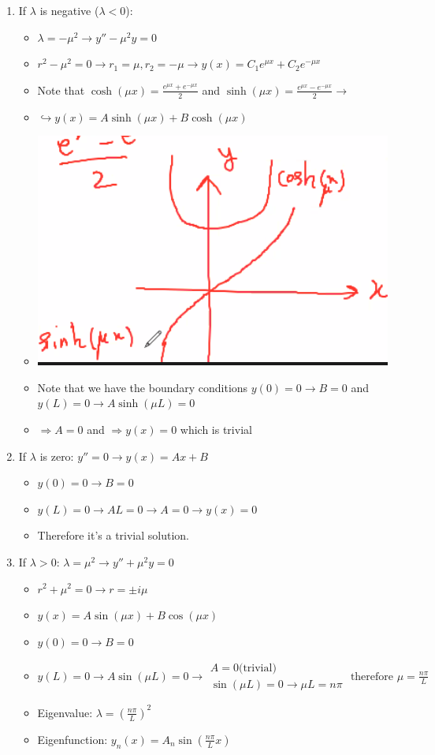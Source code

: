 \begin{enumerate}
    \item If $\lambda$ is negative ($\lambda < 0 $): 
    \begin{itemize}
        \item $\lambda = -\mu^2 \to y'' - \mu^2 y = 0$
        \item $r^2 - \mu^2 = 0 \to r_1 = \mu, r_2 = -\mu \longrightarrow y(x) = C_1 e^{\mu x} + C_2 e^{-\mu x}$
        \item Note that $\cosh(\mu x) = \frac{e^{\mu x} + e^{-\mu x}}{2} $ and $\sinh(\mu x) = \frac{e^{\mu x} - e^{-\mu x}}{2} \longrightarrow$
        \item $\hookrightarrow y(x) = A \sinh(\mu x) + B \cosh(\mu x)$
        \item \includegraphics[width = 0.6 \textwidth]{image1.png}
        \item Note that we have the boundary conditions $y(0) = 0 \to B = 0$ and $y(L) = 0 \to A\sinh(\mu L) = 0$
        \item $\Rightarrow A = 0$ and $\Rightarrow y(x) = 0$ which is trivial
    \end{itemize}
    \item If $\lambda$ is zero: $y'' = 0 \longrightarrow y(x) = Ax + B$
    \begin{itemize}
        \item $y(0) = 0 \longrightarrow B = 0$
        \item $y(L) = 0 \longrightarrow AL = 0 \to A = 0 \to y(x) = 0$
        \item Therefore it's a trivial solution. 
    \end{itemize}
    \item If $\lambda > 0$: $\lambda = \mu^2 \to y'' + \mu^2 y = 0$
    \begin{itemize}
        \item $r^2 + \mu^2 = 0 \longrightarrow r = \pm i \mu$
        \item $y(x) = A \sin(\mu x) + B \cos(\mu x)$
        \item $y(0) = 0 \to B = 0$
        \item $y(L) = 0 \to A \sin(\mu L) = 0 \to \begin{matrix} A = 0 \text{(trivial)} \\ \sin(\mu L) = 0 \to \mu L = n \pi  \end{matrix} \text{ therefore } \mu = \frac{n \pi}{L}$
        \item Eigenvalue: $\lambda = \left(\frac{n \pi}{L} \right)^2$
        \item Eigenfunction: $y_n(x) = A_n \sin(\frac{n \pi}{L} x)$
    \end{itemize}
\end{enumerate}

